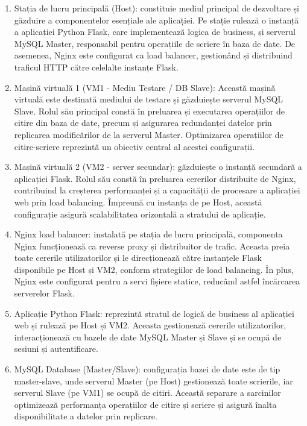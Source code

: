 \documentclass[12pt, a4paper, oneside, romanian]{teza-upb}
\begin{document}
\begin{enumerate}
\item Stația de lucru principală (Host): constituie mediul principal de dezvoltare și găzduire a componentelor esențiale ale aplicației. Pe stație rulează o instanță a aplicației Python Flask, care implementează logica de business, și serverul MySQL Master, responsabil pentru operațiile de scriere în baza de date. De asemenea, Nginx este configurat ca load balancer, gestionând și distribuind traficul HTTP către celelalte instanțe Flask.
\item Mașină virtuală 1 (VM1 - Mediu Testare / DB Slave): Această mașină virtuală este destinată mediului de testare și găzduiește serverul MySQL Slave. Rolul său principal constă în preluarea și executarea operațiilor de citire din baza de date, precum și asigurarea redundanței datelor prin replicarea modificărilor de la serverul Master. Optimizarea operațiilor de citire-scriere reprezintă un obiectiv central al acestei configurații.
\item Mașină virtuală 2 (VM2 - server secundar): găzduiește o instanță secundară a aplicației Flask. Rolul său constă în preluarea cererilor distribuite de Nginx, contribuind la creșterea performanței și a capacității de procesare a aplicației web prin load balancing. Împreună cu instanța de pe Host, această configurație asigură scalabilitatea orizontală a stratului de aplicație.
\item Nginx load balancer: instalată pe stația de lucru principală, componenta Nginx funcționează ca reverse proxy și distribuitor de trafic. Aceasta preia toate cererile utilizatorilor și le direcționează către instanțele Flask disponibile pe Host și VM2, conform strategiilor de load balancing. În plus, Nginx este configurat pentru a servi fișiere statice, reducând astfel încărcarea serverelor Flask.
\item Aplicație Python Flask: reprezintă stratul de logică de business al aplicației web și rulează pe Host și VM2. Aceasta gestionează cererile utilizatorilor, interacționează cu bazele de date MySQL Master și Slave și se ocupă de sesiuni și autentificare.
\item MySQL Database (Master/Slave): configurația bazei de date este de tip master-slave, unde serverul Master (pe Host) gestionează toate scrierile, iar serverul Slave (pe VM1) se ocupă de citiri. Această separare a sarcinilor optimizează performanța operațiilor de citire și scriere și asigură înalta disponibilitate a datelor prin replicare.

\end{enumerate}
\end{document}
